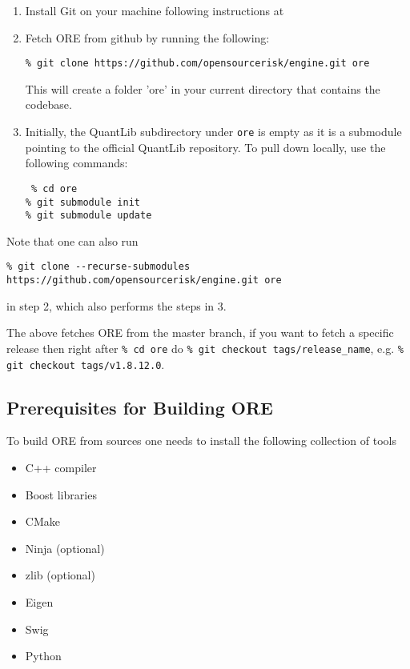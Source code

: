 \begin{enumerate}
\item Install Git on your machine following instructions at \cite{git-download}

\item Fetch ORE from github by running the following: 

{\tt\% git clone https://github.com/opensourcerisk/engine.git ore}      

This will create a folder 'ore' in your current directory that contains the codebase.

\item Initially, the QuantLib subdirectory under {\tt ore} is empty as it is a submodule pointing to the official
  QuantLib repository. To pull down locally, use the following commands:

{\tt
\% cd ore \\
\% git submodule init \\
\% git submodule update
}

\end{enumerate}

Note that one can also run 

{\footnotesize \tt\% git clone -{}-recurse-submodules https://github.com/opensourcerisk/engine.git ore}

in step 2, which also performs the steps in 3.

The above fetches ORE from the master branch, if you want to fetch a specific release then right after {\tt\% cd ore} do {\tt\% git checkout tags/release\_name}, e.g. {\tt\% git checkout tags/v1.8.12.0}. 

\subsection{Prerequisites for Building ORE}
\label{sec:prerequisites}

To build ORE from sources one needs to install the following collection of tools
\begin{itemize}
\item C++ compiler
\item Boost libraries
\item CMake
\item Ninja (optional)
\item zlib (optional)
\item Eigen 
\item Swig
\item Python
\end{itemize}

